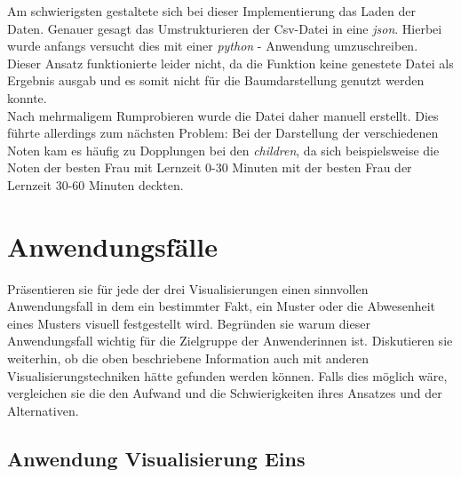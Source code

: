 \documentclass[usegeometry=true]{scrartcl}
\begin{document}
\noindent Am schwierigsten gestaltete sich bei dieser Implementierung das Laden der Daten. Genauer gesagt das Umstrukturieren der Csv-Datei in eine \textit{json}. Hierbei wurde anfangs versucht dies mit einer \textit{python} - Anwendung umzuschreiben. Dieser Ansatz funktionierte leider nicht, da die Funktion keine genestete Datei als Ergebnis ausgab und es somit nicht für die Baumdarstellung genutzt werden konnte. \\
Nach mehrmaligem Rumprobieren wurde die Datei daher manuell erstellt. Dies führte allerdings zum nächsten Problem: Bei der Darstellung der verschiedenen Noten kam es häufig zu Dopplungen bei den \textit{children}, da sich beispielsweise die Noten der besten Frau mit Lernzeit 0-30 Minuten mit der besten Frau der Lernzeit 30-60 Minuten deckten. %

























\section{Anwendungsfälle}
Präsentieren sie für jede der drei Visualisierungen einen sinnvollen Anwendungsfall in dem ein bestimmter Fakt, ein Muster oder die Abwesenheit eines Musters visuell festgestellt wird. Begründen sie warum dieser Anwendungsfall wichtig für die Zielgruppe der Anwenderinnen ist. Diskutieren sie weiterhin, ob die oben beschriebene Information auch mit anderen Visualisierungstechniken hätte gefunden werden können. Falls dies möglich wäre, vergleichen sie die den Aufwand und die Schwierigkeiten ihres Ansatzes und der Alternativen. 
\subsection{Anwendung Visualisierung Eins}
\label{AnwEins}
\end{document}
